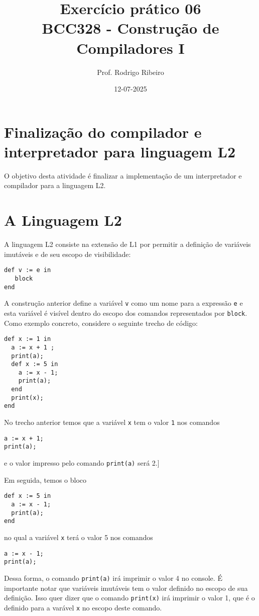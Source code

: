 \documentclass[a4paper,11pt]{article}
\author{Prof. Rodrigo Ribeiro}
\date{12-07-2025}
\title{Exercício prático 06\\\medskip
\large BCC328 - Construção de Compiladores I}
\begin{document}
\maketitle
\section*{Finalização do compilador e interpretador para linguagem L2}
\label{sec:org73a3677}

O objetivo desta atividade é finalizar a implementação de um interpretador e
compilador para  a linguagem L2.
\section*{A Linguagem L2}
\label{sec:orgcd9e903}

A linguagem L2 consiste na extensão de L1 por permitir a definição de variáveis imutáveis
e de seu escopo de visibilidade:

\begin{verbatim}
def v := e in
   block
end
\end{verbatim}

A construção anterior define a variável \texttt{v} como um nome para a expressão \texttt{e} e esta variável
é visível dentro do escopo dos comandos representados por \texttt{block}. Como exemplo concreto,
considere o seguinte trecho de código:

\begin{verbatim}
def x := 1 in
  a := x + 1 ;
  print(a);
  def x := 5 in
    a := x - 1;
    print(a);
  end
  print(x);
end
\end{verbatim}

No trecho anterior temos que a variável \texttt{x} tem o valor \texttt{1} nos comandos
\begin{verbatim}
a := x + 1;
print(a);
\end{verbatim}
e o valor impresso pelo comando \texttt{print(a)} será 2.]

Em seguida, temos o bloco

\begin{verbatim}
def x := 5 in
  a := x - 1;
  print(a);
end
\end{verbatim}
no qual a variável \texttt{x} terá o valor 5 nos comandos
\begin{verbatim}
a := x - 1;
print(a);
\end{verbatim}
Dessa forma, o comando \texttt{print(a)} irá imprimir o valor 4 no console.
É importante notar que variáveis imutáveis tem o valor definido no
escopo de sua definição. Isso quer dizer que o comando \texttt{print(x)}
irá imprimir o valor 1, que é o definido para a varável \texttt{x} no escopo
deste comando.
\end{document}
